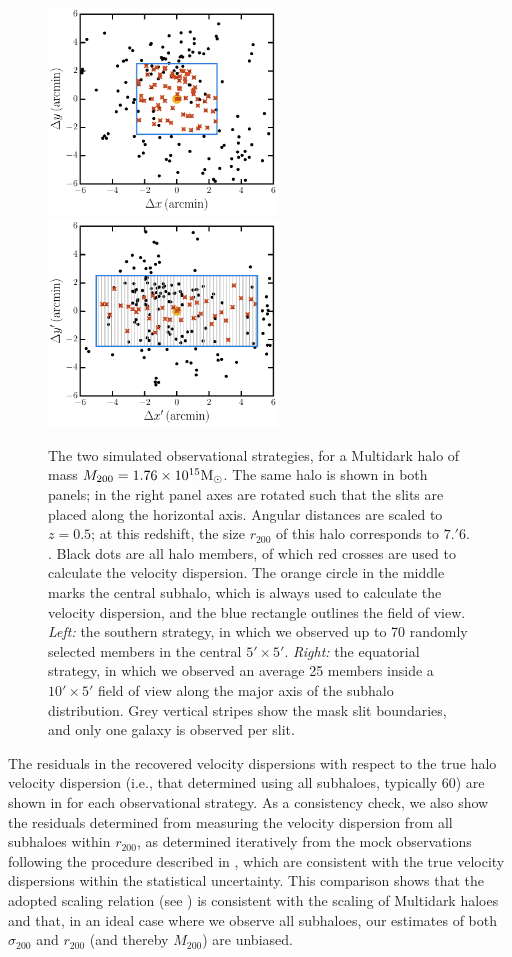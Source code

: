 \begin{figure}
 \centerline{\includegraphics[width=2.4in]{chapter3/observation_south.pdf}
             \includegraphics[width=2.4in]{chapter3/observation_equator.pdf}}
\caption{The two simulated observational strategies, for a Multidark halo of mass 
$M_{200}=1.76\times10^{15}{\rm M}_\odot$. The same halo is shown in both panels; in the right panel axes 
are rotated such that the slits are placed along the horizontal axis. Angular distances are
scaled to $z=0.5$; at this redshift, the size $r_{200}$ of this halo corresponds to 
$7.\!'6.$. Black dots are all halo members, of which red crosses are used to calculate the 
velocity dispersion. The orange circle in the middle marks the central subhalo, which is always 
used to calculate the velocity dispersion, and the blue rectangle outlines the field of view. 
\textit{Left:} the southern strategy, in which we observed up to 70 randomly selected members in 
the central $5'\times5'$. \textit{Right:} the equatorial strategy, in which we 
observed an average 25 members inside a $10'\times5'$ field of view along the major 
axis of the subhalo distribution. Grey vertical stripes show the mask slit boundaries, and only 
one galaxy is observed per slit.}
\label{f:observations}
\end{figure}

The residuals in the recovered velocity dispersions with respect to the true halo velocity 
dispersion (i.e., that determined using all subhaloes, typically 60) are shown in 
 for each observational strategy. As a consistency check, we also show the 
residuals determined from measuring the velocity dispersion from all subhaloes within $r_{200}$, as 
determined iteratively from the mock observations following the procedure described in 
, which are consistent with the true velocity dispersions within the statistical 
uncertainty. This comparison shows that the adopted scaling relation (see ) is 
consistent with the scaling of Multidark haloes and that, in an ideal case where we observe all 
subhaloes, our estimates of both $\sigma_{200}$ and $r_{200}$ (and thereby $M_{200}$) are unbiased.

